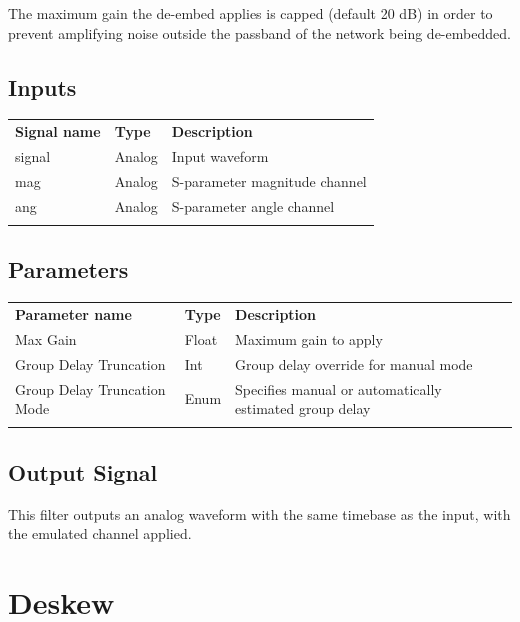 The maximum gain the de-embed applies is capped (default 20 dB) in order to prevent amplifying noise outside the
passband of the network being de-embedded.

\subsection{Inputs}

\begin{tabularx}{16cm}{llX}
\thickhline
\textbf{Signal name} & \textbf{Type} & \textbf{Description} \\
\thickhline
signal & Analog & Input waveform \\
\thinhline
mag & Analog & S-parameter magnitude channel \\
\thinhline
ang & Analog & S-parameter angle channel \\
\thickhline
\end{tabularx}

\subsection{Parameters}

\begin{tabularx}{16cm}{llX}
\thickhline
\textbf{Parameter name} & \textbf{Type} & \textbf{Description} \\
\thickhline
Max Gain & Float & Maximum gain to apply\\
\thinhline
Group Delay Truncation & Int & Group delay override for manual mode\\
\thinhline
Group Delay Truncation Mode & Enum & Specifies manual or automatically estimated group delay\\
\thickhline
\end{tabularx}

\subsection{Output Signal}

This filter outputs an analog waveform with the same timebase as the input, with the emulated channel applied.

\pagebreak
\section{Deskew}

